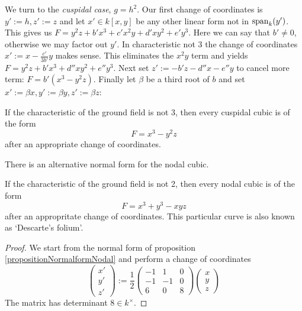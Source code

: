 We turn to the \emph{cuspidal case}, $g = h^2$.
Our first change of coordinates is $y' := h, z' := z$ and let $x' \in k[x,y]$ be any other linear form not in ${\operatorname{span}}_k(y')$.
This gives us $F = y^2z + b'x^3 + c'x^2y + d'xy^2 + e'y^3$.
Here we can say that $b' \neq 0$, otherwise we may factor out $y'$.
In characteristic not 3 the change of coordinates $x' := x - \frac{c'}{3b'}y$ makes sense.
This eliminates the $x^2y$ term and yields $F = y^2z + b'x^3 +  d''xy^2 + e''y^3$.
Next set $z' := -b'z -d''x -e''y$ to cancel more term: $F = b'(x^3 - y^2z)$.
Finally let $\beta$ be a third root of $b$ and set $x' := \beta x, y' := \beta y, z' := \beta z$:
\begin{proposition} \label{propositionNormalformCuspidal}
If the characteristic of the ground field is not 3, then every cuspidal cubic is of the form
\begin{equation}
F = x^3 - y^2z
\end{equation}
after an appropriate change of coordinates.
\end{proposition}

There is an alternative normal form for the nodal cubic.

\begin{proposition} \label{propositionNormalformNodal2}
If the characteristic of the ground field is not 2, then every nodal cubic is of the form
\begin{equation}
F = x^3 + y^3 - xyz
\end{equation}
after an appropritate change of coordinates.
This particular curve is also known as `Descarte's folium'.
\end{proposition}

\begin{proof}
We start from the normal form of proposition \ref{propositionNormalformNodal} and perform a change of coordinates
\begin{equation}
\begin{pmatrix} x' \\ y' \\ z' \end{pmatrix}
:=
\frac 12
\begin{pmatrix}
-1 & 1 & 0 \\
-1 & -1 & 0 \\
6 & 0 & 8
\end{pmatrix}
\begin{pmatrix} x \\ y \\ z \end{pmatrix}
\end{equation}
The matrix has determinant $8 \in k^\times$.
\end{proof}
